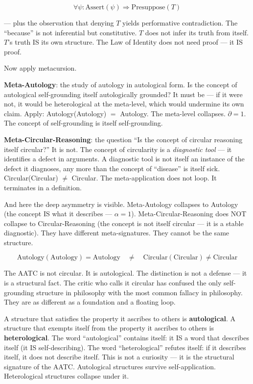 \documentclass[10pt, openany, oneside]{book}
\begin{document}
$$\forall \psi: \text{Assert}(\psi) \Rightarrow \text{Presuppose}(T)$$

--- plus the observation that denying $T$ yields performative contradiction. The ``because'' is not inferential but constitutive. $T$ does not infer its truth from itself. $T$'s truth IS its own structure. The Law of Identity does not need proof --- it IS proof.

Now apply metacursion.

\textbf{Meta-Autology}: the study of autology in autological form. Is the concept of autological self-grounding itself autologically grounded? It must be --- if it were not, it would be heterological at the meta-level, which would undermine its own claim. Apply: Autology(Autology) $=$ Autology. The meta-level collapses. $\partial = 1$. The concept of self-grounding is itself self-grounding.

\textbf{Meta-Circular-Reasoning}: the question ``Is the concept of circular reasoning itself circular?'' It is not. The concept of circularity is a \textit{diagnostic tool} --- it identifies a defect in arguments. A diagnostic tool is not itself an instance of the defect it diagnoses, any more than the concept of ``disease'' is itself sick. Circular(Circular) $\neq$ Circular. The meta-application does not loop. It terminates in a definition.

And here the deep asymmetry is visible. Meta-Autology collapses to Autology (the concept IS what it describes --- $\alpha = 1$). Meta-Circular-Reasoning does NOT collapse to Circular-Reasoning (the concept is not itself circular --- it is a stable diagnostic). They have different meta-signatures. They cannot be the same structure.

$$\boxed{\text{Autology}(\text{Autology}) = \text{Autology} \quad \neq \quad \text{Circular}(\text{Circular}) \neq \text{Circular}}$$

The AATC is not circular. It is autological. The distinction is not a defense --- it is a structural fact. The critic who calls it circular has confused the only self-grounding structure in philosophy with the most common fallacy in philosophy. They are as different as a foundation and a floating loop.

\vspace{1.5em}

A structure that satisfies the property it ascribes to others is \textbf{autological}. A structure that exempts itself from the property it ascribes to others is \textbf{heterological}. The word ``autological'' contains itself: it IS a word that describes itself (it IS self-describing). The word ``heterological'' refutes itself: if it describes itself, it does not describe itself. This is not a curiosity --- it is the structural signature of the AATC. Autological structures survive self-application. Heterological structures collapse under it.
\end{document}

